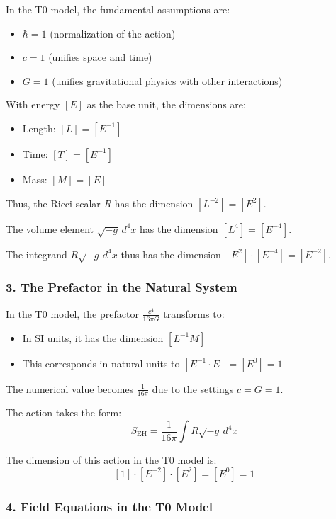 \documentclass[12pt,a4paper]{article}
\begin{document}
	In the T0 model, the fundamental assumptions are:
	\begin{itemize}
		\item $\hbar = 1$ (normalization of the action)
		\item $c = 1$ (unifies space and time)
		\item $G = 1$ (unifies gravitational physics with other interactions)
	\end{itemize}
	
	With energy $[E]$ as the base unit, the dimensions are:
	\begin{itemize}
		\item Length: $[L] = [E^{-1}]$
		\item Time: $[T] = [E^{-1}]$
		\item Mass: $[M] = [E]$
	\end{itemize}
	
	Thus, the Ricci scalar $R$ has the dimension $[L^{-2}] = [E^2]$.
	
	The volume element $\sqrt{-g} \, d^4x$ has the dimension $[L^4] = [E^{-4}]$.
	
	The integrand $R\sqrt{-g} \, d^4x$ thus has the dimension $[E^2] \cdot [E^{-4}] = [E^{-2}]$.
	
	\subsubsection*{3. The Prefactor in the Natural System}
	
	In the T0 model, the prefactor $\frac{c^4}{16\pi G}$ transforms to:
	\begin{itemize}
		\item In SI units, it has the dimension $[L^{-1} M]$
		\item This corresponds in natural units to $[E^{-1} \cdot E] = [E^0] = 1$
	\end{itemize}
	
	The numerical value becomes $\frac{1}{16\pi}$ due to the settings $c = G = 1$.
	
	The action takes the form:
	\[
	S_{\mathrm{EH}} = \frac{1}{16\pi} \int R \sqrt{-g} \, d^4x
	\]
	
	The dimension of this action in the T0 model is:
	\[
	[1] \cdot [E^{-2}] \cdot [E^2] = [E^0] = 1
	\]
	
	\subsubsection*{4. Field Equations in the T0 Model}
	
\end{document}
